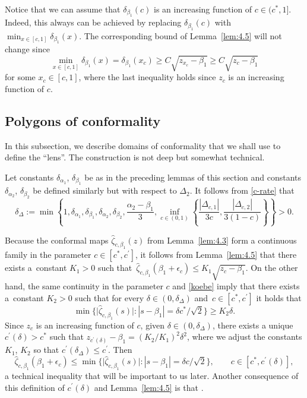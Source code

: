 \documentclass[10pt,a4paper]{amsart}
\numberwithin{equation}{section}
\begin{document}
Notice that we can assume that $ \delta_{\beta_1}(c) $ is an increasing function of $ c\in(c^*,1] $. Indeed, this always can be achieved by replacing $ \delta_{\beta_1}(c) $ with $ \min_{x\in [c,1]} \delta_{\beta_1}(x) $. The corresponding bound of Lemma~\ref{lem:4.5} will not change since
\[
 \min_{x\in [c,1]} \delta_{\beta_1}(x) = \delta_{\beta_1}(x_c) \geq C \sqrt{z_{x_c}-\beta_1}\geq C\sqrt{z_c-\beta_1}
\]
for some $ x_c \in [c,1] $, where the last inequality holds since $ z_c $ is an increasing function of $ c $.


\subsection{Polygons of conformality}
\label{ss:pc}


In this subsection, we describe domains of conformality that we shall use to define the ``lens''. The construction is not deep but somewhat technical.

Let constants $ \delta_{\alpha_1}$, $\delta_{\beta_1} $ be as in the preceding lemmas of this section and constants $ \delta_{\alpha_2}$, $\delta_{\beta_2} $ be defined similarly but with respect to $ \Delta_2 $. It follows from \eqref{c-rate} that
\begin{equation}
\label{dD}
\delta_\Delta := \min\left\{ 1,\delta_{\alpha_1},\delta_{\beta_1}, \delta_{\alpha_2},\delta_{\beta_2}, \frac{\alpha_2-\beta_1}3, \inf_{c\in(0,1)}\left\{\frac{|\Delta_{c,1}|}{3c},\frac{|\Delta_{c,2}|}{3(1-c)}\right\}\right\} > 0.
\end{equation}

Because the conformal maps $ \hat\zeta_{c,\beta_1}(z) $ from Lemma~\ref{lem:4.3} form a continuous family in the parameter $ c\in[c^*,c^\prime] $, it follows from Lemma~\ref{lem:4.5} that there exists a~constant $ K_1>0 $ such that~$
\hat\zeta_{c,\beta_1}(\beta_1+\epsilon_c) \leq K_1\sqrt{z_c-\beta_1}$.
On the other hand, the same continuity in the parameter $ c $ and \eqref{koebe} imply that there exists a~constant $ K_2>0 $ such that for every $ \delta\in(0,\delta_\Delta) $ and~$ c\in[c^*,c^\prime] $ it holds that
\begin{equation}
\label{zhat-b}
\min\bigl\{ \big|\hat\zeta_{c,\beta_1}(s)\big| : |s-\beta_1|=\delta c^*/\sqrt2\bigr\} \geq K_2 \delta.
\end{equation}
Since $ z_c $ is an increasing function of $ c $, given $ \delta\in(0,\delta_\Delta) $, there exists a unique $ c^\prime(\delta)>c^* $ such that $ z_{c^\prime(\delta)} - \beta_1 = (K_2/K_1)^2\delta^2 $, where we adjust the constants $ K_1$, $K_2 $ so that $ c^\prime(\delta_\Delta)\leq c^\prime $. Then
\begin{equation}
\label{min-con}
\hat\zeta_{c,\beta_1}(\beta_1+\epsilon_c) \leq \min\bigl\{ \big|\hat\zeta_{c,\beta_1}(s)\big| : |s-\beta_1|=\delta c/\sqrt2\bigr\}, \qquad c\in[c^*,c^\prime(\delta)],
\end{equation}
a technical inequality that will be important to us later. Another consequence of this definition of $ c^\prime(\delta) $ and Lemma~\ref{lem:4.5} is that
.
\end{document}
